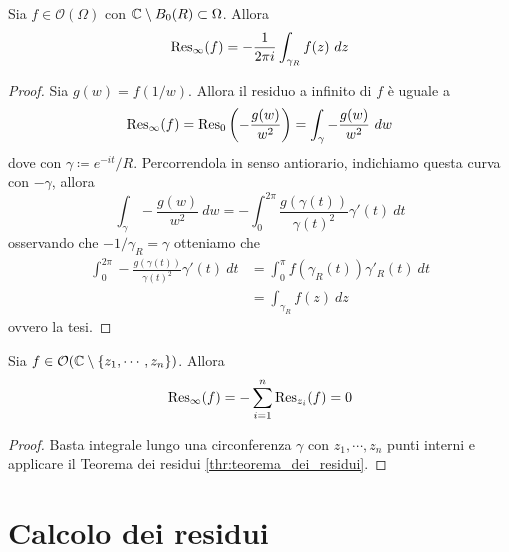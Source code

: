 \begin{lemma}
  Sia $f \in \mathcal{O}(\Omega)$ con $\mathbb{C} \setminus B_0(R) \subset \Omega$.
  Allora 
  \begin{equation*}
    \operatorname{Res}_\infty (f) = -\frac{1}{2\pi i } \int_{\gamma_R} f(z)\ dz
  \end{equation*}
  \label{lem:residuo_a_infinito}
\end{lemma}
\begin{proof}
  Sia $g(w) = f(1/w)$. Allora il residuo a infinito di $f$ è uguale a 
  \begin{equation*}
    \operatorname{Res}_\infty(f) = \operatorname{Res}_0\left(-\frac{g(w)}{w^2}  \right) = \int_{\gamma}
    -\frac{g(w)}{w^2}\ dw
  \end{equation*}
  dove con $\gamma \coloneqq e^{-it}/R$. Percorrendola in senso antiorario,
  indichiamo questa curva con $-\gamma$, allora
  \begin{equation*}
    \int_{\gamma} -\frac{g(w)}{w^2}\ dw  = - \int_{0}^{2\pi}
    \frac{g(\gamma(t))}{\gamma(t)^2} \gamma'(t)\ dt 
  \end{equation*}
  osservando che $-1/\gamma_R = \gamma$ otteniamo che 
  \begin{align*}
     \int_{0}^{2\pi} -\frac{g(\gamma(t))}{\gamma(t)^2} \gamma'(t)\ dt
     & = \int_{0}^{\pi} f(\gamma_R(t)) \gamma'_R(t) \ dt\\
     & = \int_{\gamma_R} f(z)\ dz
  \end{align*}
  ovvero la tesi.
\end{proof}

\begin{corollary}
  Sia $f \in \mathcal{O}(\mathbb{C} \setminus \left\{ z_1, \cdots, z_n \right\})$. Allora 
    \begin{equation*}
      \operatorname{Res}_\infty(f) = - \sum_{i=1}^{n} \operatorname{Res}_{z_i}(f) = 0
    \end{equation*}
\end{corollary}
\begin{proof}
  Basta integrale lungo una circonferenza $\gamma$ con $z_1, \cdots, z_n$ punti
  interni e applicare il Teorema dei residui \ref{thr:teorema_dei_residui}.
\end{proof}


\section{Calcolo dei residui}


